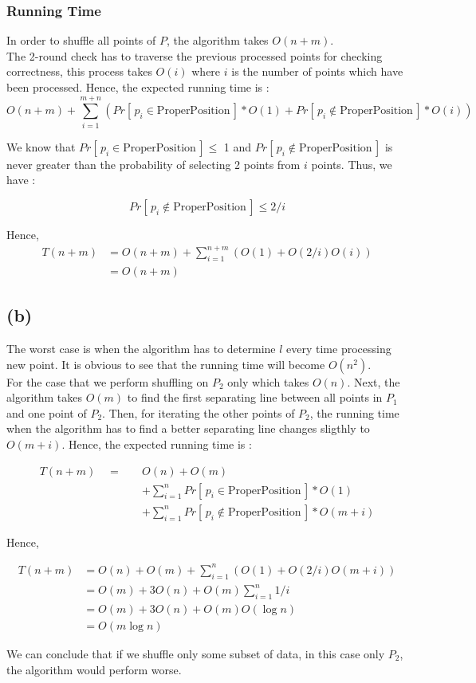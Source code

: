 \subsubsection*{Running Time}
In order to shuffle all points of $P$, the algorithm takes $O(n+m)$.\\

The 2-round check has to traverse the previous processed points for checking correctness, this process takes $O(i)$ where $i$ is the number of points which have been processed. Hence, the expected running time is :
$$
O(n+m) + \sum_{i=1}^{m+n}{ ( Pr[\,p_i \in \text{ProperPosition}\,]*O(1)
    + Pr[\,p_i \not\in \text{ProperPosition}\,]*O(i)
) }
$$

We know that $Pr[\,p_i \in \text{ProperPosition}\,] \le$ 1 and $Pr[\,p_i \not\in \text{ProperPosition}\,]$
is never greater than the probability of selecting 2 points from $i$ points. Thus,
we have :

$$
Pr[\,p_i \not\in \text{ProperPosition}\,] \le 2/i
$$

Hence,
\begin{align*}
T(n+m) &= O(n+m) + \sum_{i=1}^{n+m}( O(1) + O(2/i)O(i) ) \\
&= O(n+m)
\end{align*}

\subsection*{(b)}
The worst case is when the algorithm has to determine $l$ every time processing
new point. It is obvious to see that the running time will become $O(n^2)$. \\

For the case that we perform shuffling on $P_2$ only which takes $O(n)$. Next,
the algorithm takes $O(m)$ to find the first separating line between all points in $P_1$
and one point of $P_2$. Then, for iterating the other points of $P_2$, the running
time when the algorithm has to find a better separating line changes sligthly to
$O(m+i)$. Hence, the expected running time is :

\begin{align*}
T(n+m) \quad =\quad & O(n) + O(m) \\
        &+ \sum_{i=1}^{n}{ Pr[\,p_i \in \text{ProperPosition}\,]*O(1) } \\
        &+ \sum_{i=1}^{n}{ Pr[\,p_i \not\in \text{ProperPosition}\,]*O(m+i) }
\end{align*}

Hence,

\begin{align*}
T(n+m) &= O(n) + O(m) + \sum_{i=1}^{n}(O(1) + O(2/i)O(m+i)) \\
&= O(m) + 3O(n) + O(m)\sum_{i=1}^{n}1/i \\
&= O(m) + 3O(n) + O(m)O(\log{n}) \\
&= O(m\log{n})
\end{align*}

We can conclude that if we shuffle only some subset of data, in this case only $P_2$,
the algorithm would perform worse.
